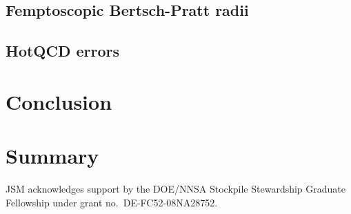 \documentclass[aps,prc,reprint,amsmath,nofootinbib,superscriptaddress]{revtex4-1}
\begin{document}
\subsection{Femptoscopic Bertsch-Pratt radii}
\label{hbt}

\subsection{HotQCD errors}
\label{errors}

\section{Conclusion}

\section{Summary}

\begin{acknowledgments}
 JSM acknowledges support by the DOE/NNSA Stockpile Stewardship Graduate Fellowship under grant no.~DE-FC52-08NA28752.
\end{acknowledgments}


\end{document}
